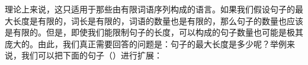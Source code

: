 理论上来说，这只适用于那些由有限词语序列构成的语言。如果我们假设句子的最大长度是有限的，词长是有限的，词语的数量也是有限的，那么句子的数量也应该是有限的。但是，即使我们能限制句子的长度，可以构成的句子数量也可能是极其庞大的。由此，我们真正需要回答的问题是：句子的最大长度是多少呢？举例来说，我们可以把下面的句子（）进行扩展：

